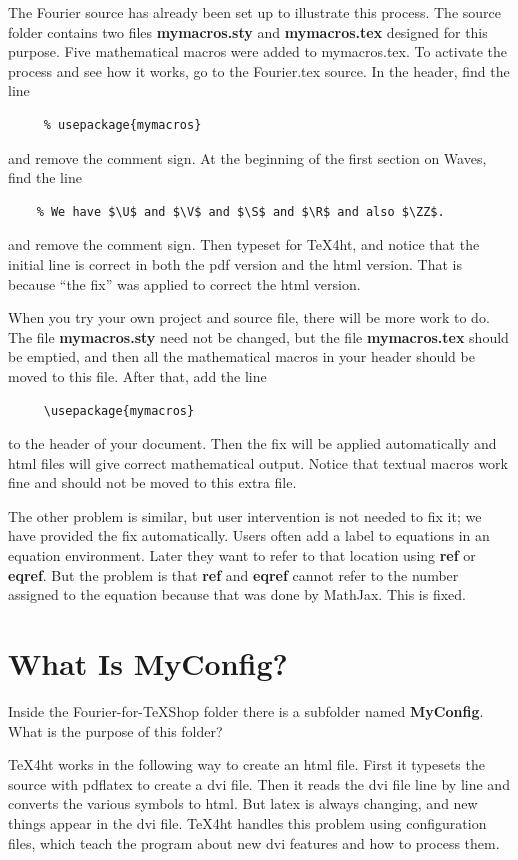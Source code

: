 \documentclass[11pt, oneside]{article}   	%
\begin{document}
The Fourier source
has already been set up to illustrate this process. The source folder contains two files
{\bf mymacros.sty} and {\bf mymacros.tex} designed for this purpose. Five mathematical macros
were added to mymacros.tex. To activate the process and see how it works,
go to the Fourier.tex source. In the header, find the line
\begin{verbatim}
     % usepackage{mymacros}
\end{verbatim}
and remove the comment sign. At the beginning of the first section on Waves, find the line
\begin{verbatim}
    % We have $\U$ and $\V$ and $\S$ and $\R$ and also $\ZZ$.
\end{verbatim}
and remove the comment sign. Then typeset for TeX4ht, and notice that the initial
line is correct in both the pdf version and the html version. That is because ``the fix'' was
applied to correct the html version.

\newpage
When you try your own project and source file, there will be more work to do. The file
{\bf mymacros.sty} need not be changed, but the file {\bf mymacros.tex} should be emptied,
and then all the mathematical macros in your header should be moved to this file.  After that,
add the line
\begin{verbatim}
     \usepackage{mymacros}
\end{verbatim}
to the header of your document.
Then the fix will be applied automatically and html files will give correct mathematical
output. Notice that textual macros work fine and should not be moved to this extra file.

The other problem is similar, but user intervention is not needed to fix it; we have provided
the fix automatically. Users often add a label to equations in an equation environment.
Later they want to refer to that location using {\bf ref} or {\bf eqref}. But the problem is that {\bf ref}
and {\bf eqref} cannot refer to the number assigned to the equation because that was done by MathJax.
This is fixed.


\section{What Is MyConfig?}

Inside the Fourier-for-TeXShop folder there is a subfolder named {\bf MyConfig}. What is the purpose of this folder?

TeX4ht works in the following way to create an html file. First it typesets the source with pdflatex to create a dvi file. Then it reads the dvi file line by line and converts the various symbols to html. But latex is always changing, and new things appear in the dvi file. TeX4ht handles this problem using configuration files,
which teach the program about new dvi features and how to process them. 
\end{document}
